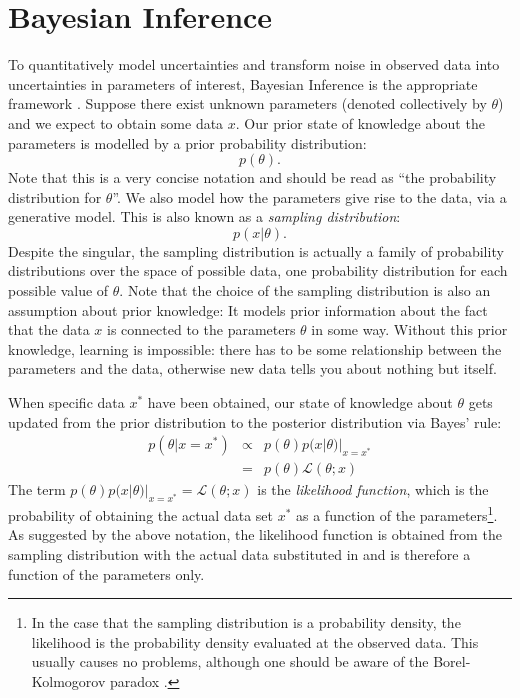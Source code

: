 \documentclass[manuscript]{aastex}
\begin{document}
\section{Bayesian Inference}
To quantitatively model uncertainties and transform noise in observed data
into uncertainties in parameters of interest, Bayesian Inference is the appropriate
framework \citep{cox, jaynes, caticha}. Suppose there exist unknown parameters
(denoted
collectively by $\theta$) and we expect to obtain some data $x$. Our prior
state of knowledge about the parameters is modelled by a prior
probability distribution:
\begin{equation}
p(\theta).
\end{equation}
Note that this is a very concise notation \citep{hogg} and should be read
as ``the probability distribution for $\theta$''.
We also model how the parameters give rise to the data, via a generative model.
This is also known as a {\it sampling distribution}:
\begin{equation}
p(x|\theta).
\end{equation}
Despite the singular, the sampling distribution is actually a family of
probability distributions over the space of possible data, one probability
distribution for each possible value
of $\theta$. Note that the choice of
the sampling distribution is also an assumption about prior knowledge:
It models prior information about the fact that the data $x$ is connected to
the parameters $\theta$ in some way. Without this prior knowledge, learning is
impossible: there has to be some relationship between the parameters and the
data, otherwise new data tells you about nothing but itself.

When specific data $x^*$ have been obtained, our state of knowledge about $\theta$
gets updated from the prior distribution to the posterior distribution
via Bayes' rule:
\begin{eqnarray}
p(\theta|x=x^*) &\propto& p(\theta)p(x|\theta)|_{x=x^*} \\
&=& p(\theta)\mathcal{L}(\theta; x)
\end{eqnarray}
The term $p(\theta)p(x|\theta)|_{x=x^*} = \mathcal{L}(\theta; x)$
is the {\it likelihood function}, which is the 
probability of obtaining the actual data set $x^*$ as a function of the
parameters\footnote{In the case that the sampling distribution is a probability
density, the likelihood is the probability density evaluated at the observed
data. This usually causes no problems, although one should be aware of the
Borel-Kolmogorov paradox \citep{jaynes}.}.
As suggested by the above notation, the likelihood function is obtained from the
sampling distribution with the actual data substituted in and is therefore
a function of the parameters only.
\end{document}
